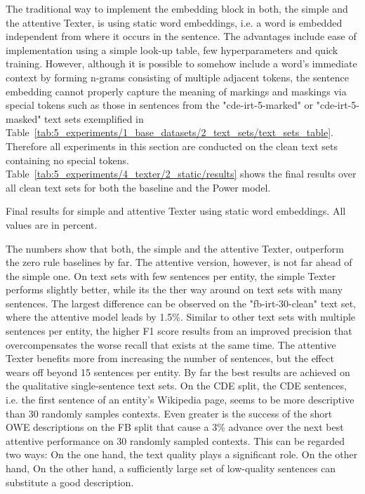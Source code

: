 The traditional way to implement the embedding block in both, the simple and the attentive Texter, is using static word embeddings, i.e. a word is embedded independent from where it occurs in the sentence. The advantages include ease of implementation using a simple look-up table, few hyperparameters and quick training. However, although it is possible to somehow include a word's immediate context by forming n-grams consisting of multiple adjacent tokens, the sentence embedding cannot properly capture the meaning of markings and maskings via special tokens such as those in sentences from the "cde-irt-5-marked" or "cde-irt-5-masked" text sets exemplified in Table~\ref{tab:5_experiments/1_base_datasets/2_text_sets/text_sets_table}. Therefore all experiments in this section are conducted on the clean text sets containing no special tokens. Table~\ref{tab:5_experiments/4_texter/2_static/results} shows the final results over all clean text sets for both the baseline and the Power model.

\begin{table}[h]
    \centering
    
    \caption{Final results for simple and attentive Texter using static word embeddings. All values are in percent.}
    \label{tab:5_experiments/4_texter/2_static/results}
\end{table}

The numbers show that both, the simple and the attentive Texter, outperform the zero rule baselines by far. The attentive version, however, is not far ahead of the simple one. On text sets with few sentences per entity, the simple Texter performs slightly better, while its the ther way around on text sets with many sentences. The largest difference can be observed on the "fb-irt-30-clean" text set, where the attentive model leads by 1.5\%. Similar to other text sets with multiple sentences per entity, the higher F1 score results from an improved precision that overcompensates the worse recall that exists at the same time. The attentive Texter benefits more from increasing the number of sentences, but the effect wears off beyond 15 sentences per entity. By far the best results are achieved on the qualitative single-sentence text sets. On the CDE split, the CDE sentences, i.e. the first sentence of an entity's Wikipedia page, seems to be more descriptive than 30 randomly samples contexts. Even greater is the success of the short OWE descriptions on the FB split that cause a 3\% advance over the next best attentive performance on 30 randomly sampled contexts. This can be regarded two ways: On the one hand, the text quality plays a significant role. On the other hand, On the other hand, a sufficiently large set of low-quality sentences can substitute a good description.


